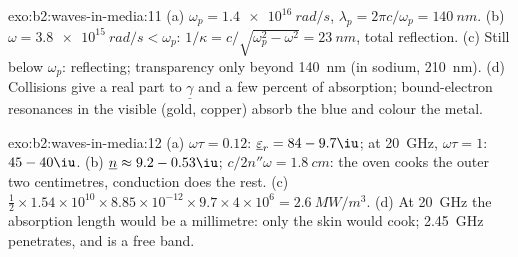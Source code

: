 \begin{solution}{exo:b2:waves-in-media:11}
(a) $\omega_p = \qty{1.4e16}{rad/s}$, $\lambda_p = 2\pi c/\omega_p = \qty{140}{nm}$. (b) $\omega = \qty{3.8e15}{rad/s}
< \omega_p$: $1/\kappa = c/\sqrt{\omega_p^2 - \omega^2} = \qty{23}{nm}$, total reflection. (c)
Still below $\omega_p$: reflecting; transparency only beyond \qty{140}{nm} (in
sodium, \qty{210}{nm}). (d) Collisions give a real part to $\underline\gamma$ and a
few percent of absorption; bound-electron resonances in the visible
(gold, copper) absorb the blue and colour the metal.
\end{solution}

\begin{solution}{exo:b2:waves-in-media:12}
(a) $\omega\tau = 0.12$: $\underline\varepsilon_r = 84 - 9.7\iu$; at \qty{20}{GHz}, $\omega\tau = 1$:
$45 - 40\iu$. (b) $\underline n \approx 9.2 - 0.53\iu$; $c/2n''\omega = \qty{1.8}{cm}$: the oven
cooks the outer two centimetres, conduction does the rest. (c) $\tfrac12 \times
1.54 \times 10^{10} \times 8.85 \times 10^{-12} \times 9.7 \times 4 \times 10^6 = \qty{2.6}{MW/m^3}$. (d) At
\qty{20}{GHz} the absorption length would be a millimetre: only the skin
would cook; \qty{2.45}{GHz} penetrates, and is a free band.
\end{solution}

